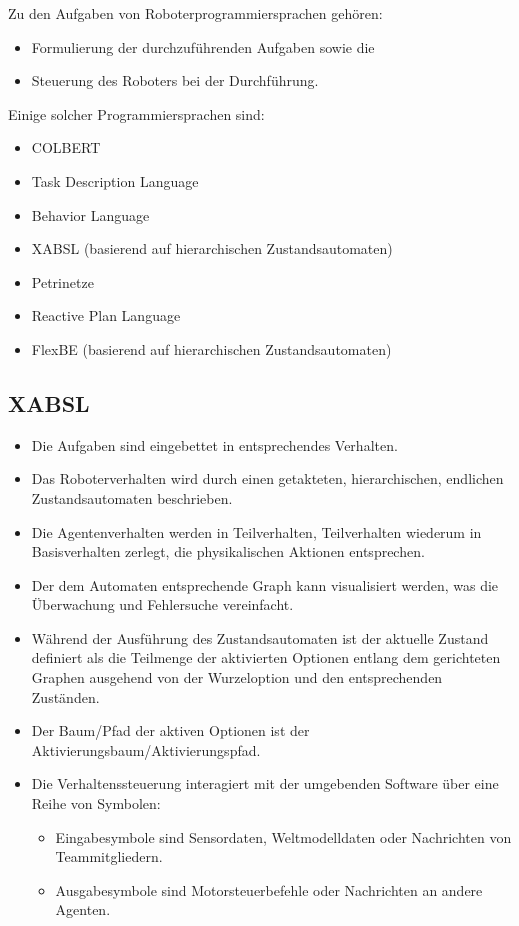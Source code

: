 		Zu den Aufgaben von Roboterprogrammiersprachen gehören:
		\begin{itemize}
			\item Formulierung der durchzuführenden Aufgaben sowie die
			\item Steuerung des Roboters bei der Durchführung.
		\end{itemize}

		Einige solcher Programmiersprachen sind:
		\begin{itemize}
			\item COLBERT
			\item Task Description Language
			\item Behavior Language
			\item XABSL (basierend auf hierarchischen Zustandsautomaten)
			\item Petrinetze
			\item Reactive Plan Language
			\item FlexBE (basierend auf hierarchischen Zustandsautomaten)
		\end{itemize}

		\subsection{XABSL}
			\begin{itemize}
				\item Die Aufgaben sind eingebettet in entsprechendes Verhalten.
				\item Das Roboterverhalten wird durch einen getakteten, hierarchischen, endlichen Zustandsautomaten beschrieben.
				\item Die Agentenverhalten werden in Teilverhalten,  Teilverhalten wiederum in Basisverhalten zerlegt, die physikalischen Aktionen entsprechen.
				\item Der dem Automaten entsprechende Graph kann visualisiert werden, was die Überwachung und Fehlersuche vereinfacht.
				\item Während der Ausführung des Zustandsautomaten ist der aktuelle Zustand definiert als die Teilmenge der aktivierten Optionen entlang dem gerichteten Graphen ausgehend von der Wurzeloption und den entsprechenden Zuständen.
				\item Der Baum/Pfad der aktiven Optionen ist der Aktivierungsbaum/Aktivierungspfad.
				\item Die Verhaltenssteuerung interagiert mit der umgebenden Software über eine Reihe von Symbolen:
					\begin{itemize}
						\item Eingabesymbole sind \zB Sensordaten, Weltmodelldaten oder Nachrichten von Teammitgliedern.
						\item Ausgabesymbole sind \zB Motorsteuerbefehle oder Nachrichten an andere Agenten.
					\end{itemize}
			\end{itemize}

